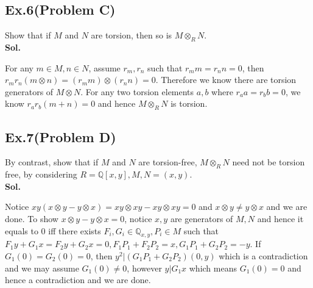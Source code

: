 \documentclass[lang=en,11pt,a4paper,citestyle =authoryear]{elegantpaper}
\begin{document}
\subsection*{Ex.6(Problem C)} 
Show that if $M$ and $N$ are torsion, then so is $M\otimes_R N$.
\vspace{0.5em}\\
\textbf{Sol.} \par
For any $m\in M, n\in N$, assume $r_m,r_n$ such that $r_m  m = r_n n = 0$, then $r_mr_n (m\otimes n) = (r_m m)\otimes(r_n n) = 0$. Therefore we know there are torsion generators of $M\otimes N$. For any two torsion elements $a,b$ where $r_a a = r_b b =0$, we know $r_ar_b(m+n) = 0$ and hence $M\otimes_R N$ is torsion.
\par 
\vspace{0.5em}

\subsection*{Ex.7(Problem D)} 
By contrast, show that if $M$ and $N$ are torsion-free, $M\otimes_R N$ need not be torsion free, by considering $R = \mathbb{Q}[x,y], M,N = (x,y)$.
\vspace{0.5em}\\
\textbf{Sol.} \par
Notice $xy(x\otimes y - y\otimes x) = xy\otimes xy - xy\otimes xy = 0$ and $x\otimes y\neq y\otimes x$ and we are done. To show $x\otimes y - y\otimes x = 0$, notice $x,y$ are generators of $M,N$ and hence it equals to $0$ iff there exists $F_i,G_i\in \mathbb{Q}_{x,y}, P_i \in M$ such that  $F_1 y + G_1 x = F_2 y + G_2 x = 0, F_1P_1 + F_2P_2 = x,  G_1P_1 + G_2P_2 = -y$. If $G_1(0) = G_2(0) = 0$, then $y^2| (G_1P_1+G_2P_2)(0,y)$ which is a contradiction and we may assume $G_1(0) \neq 0$, however $y|G_1x$ which means $G_1(0) = 0$ and hence a contradiction and we are done.
\par 
\vspace{0.5em}



\addappheadtotoc
\end{document}
